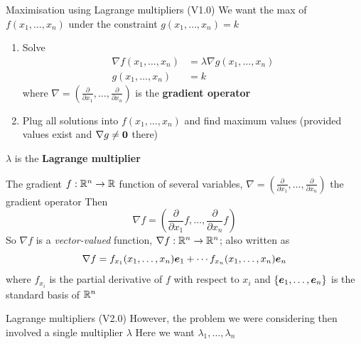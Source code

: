 \documentclass[aspectratio=169]{beamer}\usepackage[]{graphicx}\usepackage[]{xcolor}
\begin{document}
\begin{frame}{Maximisation using Lagrange multipliers (V1.0)}
    We want the max of $f(x_1,\ldots,x_n)$ under the constraint $g(x_1,\ldots,x_n)=k$
    \begin{enumerate}
    \item Solve
    \begin{align*}
    \nabla f(x_1,\ldots,x_n) &= \lambda\nabla g(x_1,\ldots,x_n) \\
    g(x_1,\ldots,x_n) &= k
    \end{align*}
    where $\nabla=(\frac{\partial}{\partial x_1},\ldots,\frac{\partial}{\partial x_n})$ is the \textbf{gradient operator}
    \item Plug all solutions into $f(x_1,\ldots,x_n)$ and find maximum values (provided values exist and $\nabla g\neq \b0$ there)
    \end{enumerate}
    \vfill
    $\lambda$ is the \textbf{Lagrange multiplier}
\end{frame}
    
    
\begin{frame}{The gradient}
    $f:\mathbb{R}^n\to\mathbb{R}$ function of several variables, $\nabla=\left(\frac{\partial}{\partial x_1},\ldots,\frac{\partial}{\partial x_n}\right)$ the gradient operator
    \vfill
    Then
    \[
    \nabla f = \left(
    \frac{\partial}{\partial x_1}f,\ldots,
    \frac{\partial}{\partial x_n}f
    \right)
    \]
    \vfill
    So $\nabla f$ is a \emph{vector-valued} function, $\nabla f:\mathbb{R}^n\to\mathbb{R}^n$; also written as
    \[
    \nabla f = f_{x_1}(x_1,\ldots,x_n)\bm{e}_1+\cdots f_{x_n}(x_1,\ldots,x_n)\bm{e}_n
    \]
    where $f_{x_i}$ is the partial derivative of $f$ with respect to $x_i$ and $\{\bm{e}_1,\ldots,\bm{e}_n\}$ is the standard basis of $\mathbb{R}^n$
\end{frame}

\begin{frame}{Lagrange multipliers (V2.0)}
        However, the problem we were considering then involved a single multiplier $\lambda$
        \vfill
        Here we want $\lambda_1,\ldots,\lambda_n$
\end{frame}
\end{document}
